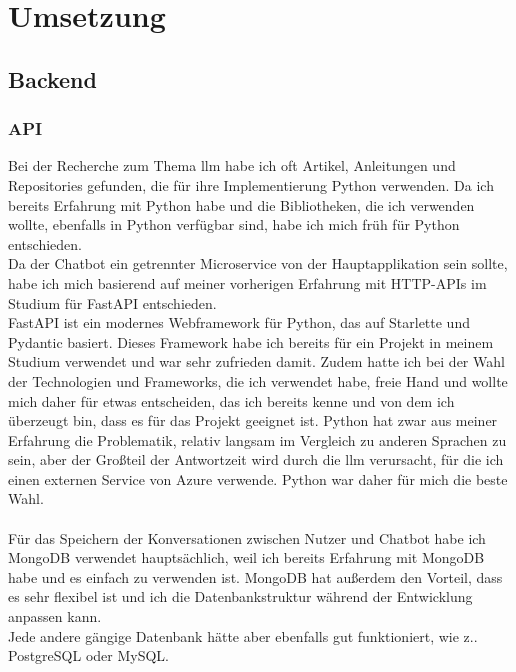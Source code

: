 \chapter{Umsetzung}\label{ch:umsetzung}
\section{Backend}\label{sec:umsetzung_backend}
\subsection{API}\label{sec:umsetzung_api}
Bei der Recherche zum Thema \gls{llm} habe ich oft Artikel, Anleitungen und Repositories gefunden, die für ihre Implementierung Python verwenden.  
Da ich bereits Erfahrung mit Python habe und die Bibliotheken, die ich verwenden wollte, ebenfalls in Python verfügbar sind, habe ich mich früh für Python entschieden.\\  
Da der Chatbot ein getrennter Microservice von der Hauptapplikation sein sollte, habe ich mich basierend auf meiner vorherigen Erfahrung mit HTTP-APIs im Studium für FastAPI entschieden.\\  
FastAPI ist ein modernes Webframework für Python, das auf Starlette und Pydantic basiert.  
Dieses Framework habe ich bereits für ein Projekt in meinem Studium verwendet und war sehr zufrieden damit.  
Zudem hatte ich bei der Wahl der Technologien und Frameworks, die ich verwendet habe, freie Hand und wollte  
mich daher für etwas entscheiden, das ich bereits kenne und von dem ich überzeugt bin, dass es für das Projekt geeignet ist.  
Python hat zwar aus meiner Erfahrung die Problematik, relativ langsam im Vergleich zu anderen Sprachen zu sein, aber der Großteil der Antwortzeit wird durch die \gls{llm} verursacht,  
für die ich einen externen Service von Azure verwende. Python war daher für mich die beste Wahl.\\\\  
Für das Speichern der Konversationen zwischen Nutzer und Chatbot habe ich MongoDB verwendet hauptsächlich, weil ich bereits Erfahrung mit MongoDB habe und es einfach zu verwenden ist.  
MongoDB hat außerdem den Vorteil, dass es sehr flexibel ist und ich die Datenbankstruktur während der Entwicklung anpassen kann.\\  
Jede andere gängige Datenbank hätte aber ebenfalls gut funktioniert, wie z.\B. PostgreSQL oder MySQL.\\

